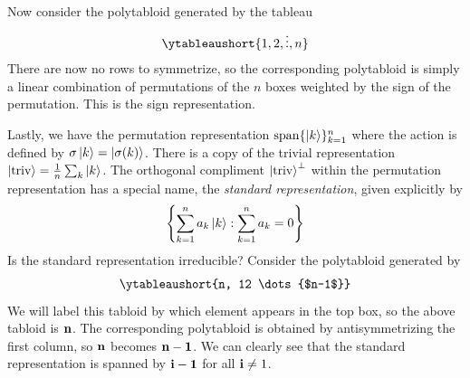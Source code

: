 \documentclass[11pt]{article}
\theoremstyle{definition}
\begin{document}
Now consider the polytabloid generated by the tableau
\begin{align}
\ytableaushort{1, 2, \vdots, n}
\end{align}
There are now no rows to symmetrize, so the corresponding polytabloid is simply
a linear combination of permutations of the $n$ boxes weighted by the sign of
the permutation. This is the sign representation.

Lastly, we have the permutation representation $\operatorname{span}\{\ket{k}\}_{k=1}^n$ where
the action is defined by $\sigma\ket{k} = \ket{\sigma(k)}$. There is a copy of
the trivial representation $\ket{\mathrm{triv}} = \frac{1}{n}\sum_k \ket{k}$.
The orthogonal compliment $\ket{\mathrm{triv}}^{\perp}$ within the permutation
representation has a special name, the \textit{standard representation}, given
explicitly by
\begin{align}
  \left\{\sum_{k = 1}^n a_k \ket{k} : \sum_{k=1}^n a_k = 0 \right\}
\end{align}
Is the standard representation irreducible? Consider the polytabloid generated by
\begin{align}
\ytableaushort{n, 12 \dots {$n-1$}}
\end{align}
We will label this tabloid by which element appears in the top box, so the above
tabloid is $\vb n$. The corresponding polytabloid is obtained by antisymmetrizing
the first column, so $\vb n$ becomes $\vb n - \vb 1$. We can clearly see that
the standard representation is spanned by $\vb i - \vb 1$ for all $\vb i \neq
1$.


\nocite{*}

\end{document}
